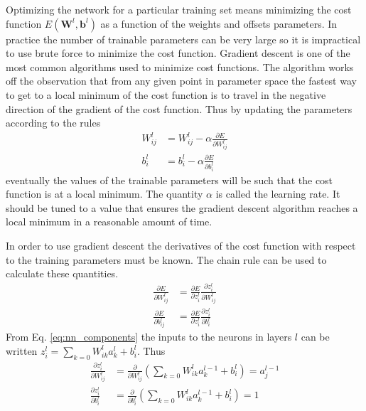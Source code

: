 \documentclass{article}
\begin{document}
Optimizing the network for a particular training set means minimizing the cost function $E \left(\textbf{W}^l, \textbf{b}^l \right)$ as a function of the weights and offsets parameters. In practice the number of trainable parameters can be very large so it is impractical to use brute force to minimize the cost function. Gradient descent is one of the most common algorithms used to minimize cost functions. The algorithm works off the observation that from any given point in parameter space the fastest way to get to a local minimum of the cost function is to travel in the negative direction of the gradient of the cost function. Thus by updating the parameters according to the rules
\begin{equation}
\begin{split}
W^l_{ij} &= W^l_{ij} - \alpha \frac{\partial E}{\partial W^l_{ij}} \\
b^l_i &= b^l_{i} - \alpha \frac{\partial E}{\partial b^l_i} 
\end{split}
\end{equation}
eventually the values of the trainable parameters will be such that the cost function is at a local minimum. The quantity $\alpha$ is called the learning rate. It should be tuned to a value that ensures the gradient descent algorithm reaches a local minimum in a reasonable amount of time.

In order to use gradient descent the derivatives of the cost function with respect to the training parameters must be known. The chain rule can be used to calculate these quantities.
\begin{equation}
\begin{split}
\frac{\partial E}{\partial W^l_{ij}} &= \frac{\partial E}{\partial z_i^{l} } \frac{\partial z_i^{l}}{\partial W^l_{ij}} \\
\frac{\partial E}{\partial b^l_{ij}} &= \frac{\partial E}{\partial z_i^{l}} \frac{\partial z_i^{l}}{\partial b^l_i}
\end{split}
\end{equation}
From Eq. \ref{eq:nn_components} the inputs to the neurons in layers ${l}$ can be written $z_i^{l}=\sum_{k=0} W_{ik}^{l} a_k^{l} + b_i^l$. Thus
\begin{equation}
\begin{split}
\frac{\partial z_i^{l}}{\partial W^l_{ij}} &= \frac{\partial}{\partial W^l_{ij}} \left( \sum_{k=0} W_{ik}^{l} a_k^{l-1} + b_i^l \right) = a_j^{l-1} \\
\frac{\partial z_i^{l}}{\partial b^l_i} &= \frac{\partial}{\partial b^l_{i}} \left( \sum_{k=0} W_{ik}^{l} a_k^{l-1} + b_i^l \right) = 1
\end{split}
\end{equation}
\end{document}
